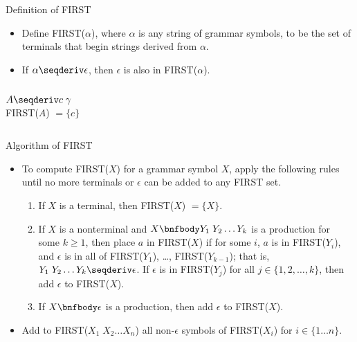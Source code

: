 \begin{bibunit}[apalike]
\begin{frame}{Definition of FIRST}
	\begin{itemize}
	\item Define FIRST($\alpha$), where $\alpha$ is any string of grammar symbols, to be the set of terminals that begin strings derived from $\alpha$.
	\item If $\alpha \seqderiv \epsilon$, then $\epsilon$ is also in FIRST($\alpha$).
	\end{itemize}
	\vfill
	\begin{example}\bnfstyle
		\begin{columns}
			\begin{column}[t]{.4\linewidth}
				$A \seqderiv c\;\gamma$ \\
				FIRST($A$) $ = \{ c \}$
			\end{column}
			\begin{column}[t]{.4\linewidth}
			\end{column}
		\end{columns}
	\end{example}
\end{frame}

\begin{frame}{Algorithm of FIRST}
	\begin{itemize}
	\item To compute FIRST($X$) for a grammar symbol $X$, apply the following rules until no more terminals or $\epsilon$ can be added to any FIRST set.
	\vfill
		\begin{enumerate}
		\item If $X$ is a terminal, then FIRST($X$) $= \{ X \}$.
		\item If $X$ is a nonterminal and $X \bnfbody Y_1\;Y_2 \dots Y_k$ is a production for some $k \ge 1$, then place $a$ in FIRST($X$) if for some $i$, $a$ is in FIRST($Y_i$), and $\epsilon$ is in all of FIRST($Y_1$), \dots, FIRST($Y_{k-1}$); that is, $Y_1\;Y_2 \dots Y_k \seqderiv \epsilon$. If $\epsilon$ is in FIRST($Y_j$) for all $j \in \{1, 2, \dots, k\}$, then add $\epsilon$ to FIRST($X$).
		\item If $X \bnfbody \epsilon$ is a production, then add $\epsilon$ to FIRST($X$).
		\end{enumerate}
	\vfill
	\item Add to FIRST($X_1\;X_2 \dots X_n$) all non-$\epsilon$ symbols of FIRST($X_i$) for $i \in \{1 \dots n\}$.
	\end{itemize}
\end{frame}


\end{bibunit}
